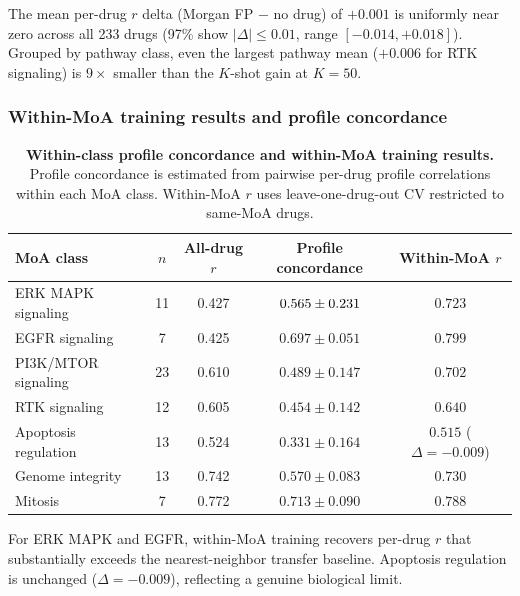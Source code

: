 The mean per-drug $r$ delta (Morgan FP $-$ no drug) of $+0.001$ is uniformly near zero across all 233 drugs (97\% show $|\Delta| \leq 0.01$, range $[-0.014, +0.018]$). Grouped by pathway class, even the largest pathway mean ($+0.006$ for RTK signaling) is $9\times$ smaller than the $K$-shot gain at $K = 50$.

\subsubsection*{Within-MoA training results and profile concordance}

\begin{table}[htbp]
\centering
\small
\caption{\textbf{Within-class profile concordance and within-MoA training results.} Profile concordance is estimated from pairwise per-drug profile correlations within each MoA class. Within-MoA $r$ uses leave-one-drug-out CV restricted to same-MoA drugs.}
\label{tab:moa_per_drug_b}
\begin{tabular}{lcccc}
\toprule
MoA class & $n$ & All-drug $r$ & Profile concordance & Within-MoA $r$ \\
\midrule
ERK MAPK signaling & 11 & 0.427 & $0.565 \pm 0.231$ & $0.723$ \\
EGFR signaling & 7 & 0.425 & $0.697 \pm 0.051$ & $0.799$ \\
PI3K/MTOR signaling & 23 & 0.610 & $0.489 \pm 0.147$ & $0.702$ \\
RTK signaling & 12 & 0.605 & $0.454 \pm 0.142$ & $0.640$ \\
Apoptosis regulation & 13 & 0.524 & $0.331 \pm 0.164$ & $0.515$ ($\Delta = -0.009$) \\
Genome integrity & 13 & 0.742 & $0.570 \pm 0.083$ & $0.730$ \\
Mitosis & 7 & 0.772 & $0.713 \pm 0.090$ & $0.788$ \\
\bottomrule
\end{tabular}
\end{table}

For ERK MAPK and EGFR, within-MoA training recovers per-drug $r$ that substantially exceeds the nearest-neighbor transfer baseline. Apoptosis regulation is unchanged ($\Delta = -0.009$), reflecting a genuine biological limit.
